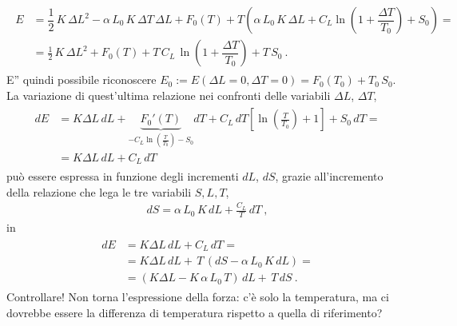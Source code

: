 \documentclass[letterpaper,10pt,italian]{jupyterBook}
\begin{document}
\begin{equation*}
\begin{split}\begin{aligned}
  E & = \dfrac{1}{2} \, K \, \Delta L^2 - \alpha \, L_0 \, K \, \Delta T \, \Delta L + F_0(T) + T \left( \alpha \, L_0 \, K \, \Delta L + C_L \ln \left( 1 + \dfrac{\Delta T}{T_0} \right) + S_0 \right) = \\
    & = \frac{1}{2} \, K \, \Delta L^2 + F_0(T) + T \, C_L \, \ln \left( 1 + \dfrac{\Delta T}{T_0} \right) + T \, S_0 \ .
\end{aligned}\end{split}
\end{equation*}
\sphinxAtStartPar
E” quindi possibile riconoscere \(E_0 := E(\Delta L = 0, \Delta T = 0) = F_0(T_0) + T_0 \, S_0\).
La variazione di quest’ultima relazione nei confronti delle variabili \(\Delta L\), \(\Delta T\),
\begin{equation*}
\begin{split}\begin{aligned}
  d E & = K \Delta L \, d L + \underbrace{F_0'(T)}_{- C_L \ln \left(\frac{T}{T_0}\right) - S_0} dT + C_L \, d T \left[ \ln \left(\frac{T}{T_0}\right) + 1 \right] + S_0 \, d T = \\
      & = K \Delta L \, d L + C_L \, d T
\end{aligned}\end{split}
\end{equation*}
\sphinxAtStartPar
può essere espressa in funzione degli incrementi \(d L\), \(d S\), grazie all’incremento della relazione che lega le tre variabili \(S, L, T\),
\begin{equation*}
\begin{split}d S = \alpha \, L_0 \, K \, d L + \frac{C_L}{T} \, dT \ ,\end{split}
\end{equation*}
\sphinxAtStartPar
in
\begin{equation*}
\begin{split}\begin{aligned}
  d E & = K \Delta L \, d L + C_L \, dT = \\
      & = K \Delta L \, d L + \, T \, ( dS - \alpha \, L_0 \, K \, dL ) = \\
      & = ( K \Delta L - K \, \alpha \, L_0 \, T ) \, d L + \, T \, dS  \ .
\end{aligned}\end{split}
\end{equation*}
\sphinxAtStartPar
{}
Controllare! Non torna l’espressione della forza: c’è solo la temperatura, ma ci dovrebbe essere la differenza di temperatura rispetto a quella di riferimento?
\end{document}
